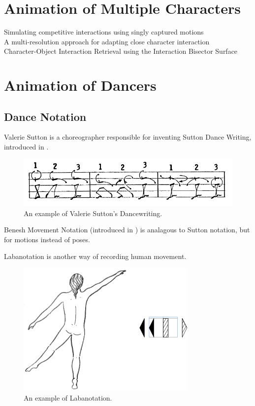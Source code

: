 \section{Animation of Multiple Characters}
Simulating competitive interactions using singly captured motions \citep{shum2007simulating} \\
  
A multi-resolution approach for adapting close character interaction \citep{ho2014multi} \\

Character-Object Interaction Retrieval using the Interaction Bisector Surface \citep{zhao2017character}


\section{Animation of Dancers}
\subsection{Dance Notation}
Valerie Sutton is a choreographer responsible for inventing Sutton Dance Writing, introduced in \citep{sutton1979sutton}. 

\begin{figure}[!h]
\centering
\includegraphics[scale=0.4]{img/sutton}
\caption{An example of Valerie Sutton's Dancewriting.}
\end{figure}

Benesh Movement Notation (introduced in \citep{causley1980introduction}) is analagous to Sutton notation, but for motions instead of poses.

Labanotation is another way of recording human movement.
\begin{figure}[!h]
\centering
\includegraphics[scale=0.5]{img/over-labanotation}
\caption{An example of Labanotation.}
\end{figure}

